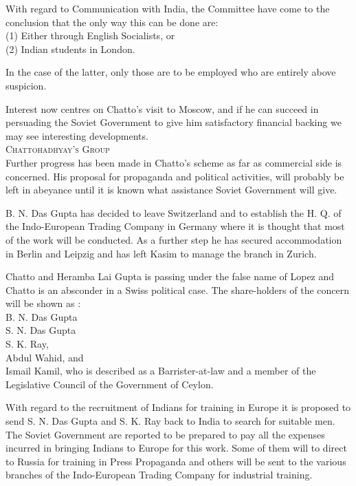 With regard to Communication with India, the Committee have come to the conclusion that the only way this can be done are: \\
(1) Either through English Socialists, or \\
(2) Indian students in London. 

In the case of the latter, only those are to be employed who are entirely above suspicion. 

Interest now centres on Chatto’s visit to Moscow, and if he can succeed in persuading the Soviet Government to give 
him satisfactory financial backing we may see interesting developments. \\

\textsc{Chattohadhyay's Group}\\

Further progress has been made in Chatto’s scheme as far as commercial side is concerned. His proposal for propaganda and political activities, will probably be left in abeyance until it is known what assistance Soviet Government will give. 

B. N. Das Gupta has decided to leave Switzerland and to establish the H. Q. of the Indo-European Trading Company 
in Germany where it is thought that most of the work will be conducted. As a further step he has secured accommodation in Berlin and Leipzig and has left Kasim to manage the branch in Zurich. 

Chatto and Heramba Lai Gupta is passing under the false name of Lopez and Chatto is an absconder in a Swiss political case. The share-holders of the concern will be shown as : \\
B. N. Das Gupta \\
S. N. Das Gupta \\
S. K. Ray, \\
Abdul Wahid, and \\
Ismail Kamil, who is described as a Barrister-at-law and a member of the Legislative Council of the Government of Ceylon. 

With regard to the recruitment of Indians for training in Europe it is proposed to send S. N. Das Gupta and S. K. Ray back to India to search for suitable men. The Soviet Government are reported to be prepared to pay all the expenses incurred in bringing Indians to Europe for this 
work. Some of them will to direct to Russia for training in Press Propaganda and others will be sent to the various branches of the Indo-European Trading Company for industrial training. 

